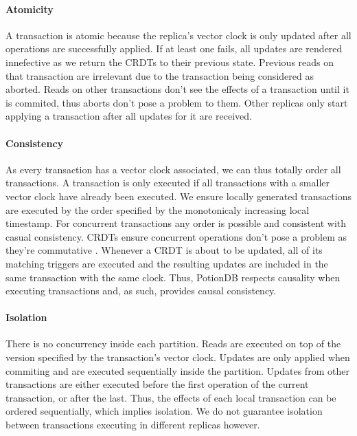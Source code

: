 \documentclass{vldb}
\begin{document}

\paragraph{Atomicity}  A transaction is atomic because the replica's vector clock is only updated after all operations are successfully applied. 
If at least one fails, all updates are rendered innefective as we return the CRDTs to their previous state.
Previous reads on that transaction are irrelevant due to the transaction being considered as aborted.
Reads on other transactions don't see the effects of a transaction until it is commited, thus aborts don't pose a problem to them.
Other replicas only start applying a transaction after all updates for it are received.

\paragraph{Consistency} As every transaction has a vector clock associated, we can thus totally order all transactions. 
A transaction is only executed if all transactions with a smaller vector clock have already been executed. 
We ensure locally generated transactions are executed by the order specified by the monotonicaly increasing local timestamp.
For concurrent transactions any order is possible and consistent with casual consistency.
CRDTs ensure concurrent operations don't pose a problem as they're commutative \cite{???}.
Whenever a CRDT is about to be updated, all of its matching triggers are executed and the resulting updates are included in the same transaction with the same clock.
Thus, PotionDB respects causality when executing transactions and, as such, provides causal consistency.

\paragraph{Isolation} %
There is no concurrency inside each partition.
Reads are executed on top of the version specified by the transaction's vector clock. %
Updates are only applied when commiting and are executed sequentially inside the partition.
Updates from other transactions are either executed before the first operation of the current transaction, or after the last.
Thus, the effects of each local transaction can be ordered sequentially, which implies isolation.
We do not guarantee isolation between transactions executing in different replicas however.
\end{document}
